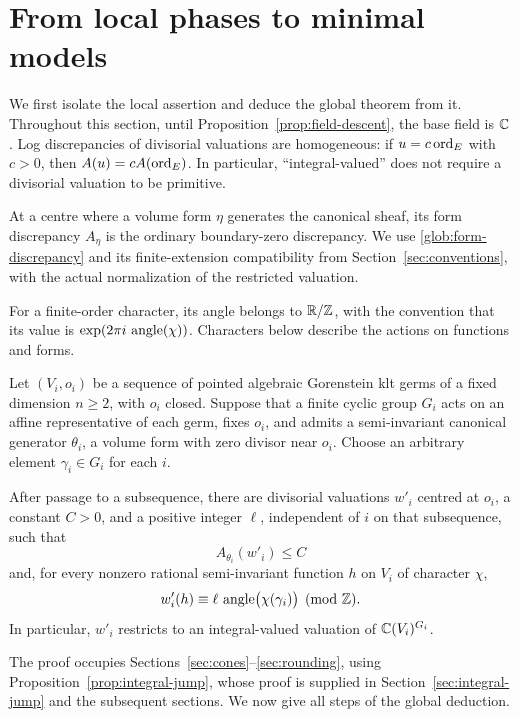 \section{From local phases to minimal models}\label{sec:global}

We first isolate the local assertion and deduce the global theorem from it.
Throughout this section, until Proposition~\ref{prop:field-descent}, the base
field is $\mathbb C$.  Log discrepancies of divisorial valuations are homogeneous:
if $u=c\operatorname{ord}_E$ with $c>0$, then $A(u)=cA(\operatorname{ord}_E)$.  In particular,
``integral-valued'' does not require a divisorial valuation to be primitive.

At a centre where a volume form $\eta$ generates the canonical sheaf,
its form discrepancy $A_\eta$ is the ordinary boundary-zero discrepancy.
We use \eqref{glob:form-discrepancy} and its finite-extension compatibility
from Section~\ref{sec:conventions}, with the actual normalization of the
restricted valuation.

For a finite-order character, its angle belongs to $\mathbb R/\mathbb Z$, with the
convention that its value is $\exp(2\pi i\,\operatorname{angle}(\chi))$.
Characters below describe the actions on functions and forms.

\begin{theorem}\label{thm:phase}
Let $(V_i,o_i)$ be a sequence of pointed algebraic Gorenstein klt germs of a
fixed dimension $n\geq2$, with $o_i$ closed.  Suppose that a finite cyclic
group $G_i$ acts on an affine representative of each germ, fixes $o_i$, and
admits a semi-invariant canonical generator $\theta_i$, a volume form with
zero divisor near $o_i$.  Choose
an arbitrary element $\gamma_i\in G_i$ for each $i$.

After passage to a subsequence, there are divisorial valuations $w'_i$
centred at $o_i$, a constant $C>0$, and a positive integer $\ell$, independent
of $i$ on that subsequence, such that
\[
 A_{\theta_i}(w'_i)\leq C
\]
and, for every nonzero rational semi-invariant function $h$ on $V_i$ of
character $\chi$,
\begin{equation}\label{glob:phase-congruence}
 w'_i(h)\equiv\ell\,\operatorname{angle}\bigl(\chi(\gamma_i)\bigr)
 \pmod{\mathbb Z}.
\end{equation}
In particular, $w'_i$ restricts to an integral-valued valuation of
$\mathbb C(V_i)^{G_i}$.
\end{theorem}

The proof occupies Sections~\ref{sec:cones}--\ref{sec:rounding}, using
Proposition~\ref{prop:integral-jump}, whose proof is supplied in
Section~\ref{sec:integral-jump} and the subsequent sections.  We now give all
steps of the global deduction.

